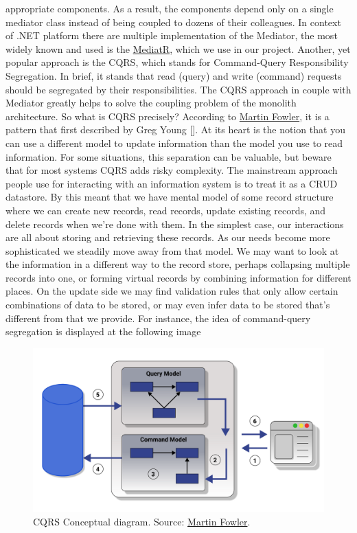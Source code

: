 appropriate components.
As a result, the components depend only on a single mediator class instead of being coupled to dozens of their colleagues.
In context of .NET platform there are multiple implementation of the Mediator, the most widely known and used is the
\href{https://github.com/jbogard/MediatR}{MediatR}, which we use in our project.
Another, yet popular approach is the CQRS, which stands for Command-Query Responsibility Segregation.
In brief, it stands that read (query) and write (command) requests should be segregated by their responsibilities.
The CQRS approach in couple with Mediator greatly helps to solve the coupling problem of the monolith architecture.
So what is CQRS precisely?
According to \href{https://martinfowler.com/bliki/CQRS.html}{Martin Fowler},
it is a pattern that first described by Greg Young [\cite{young2010cqrs}].
At its heart is the notion that you can use a different model to update information than the model you use to read information.
For some situations, this separation can be valuable, but beware that for most systems CQRS adds risky complexity.
The mainstream approach people use for interacting with an information system is to treat it as a CRUD datastore.
By this meant that we have mental model of some record structure where we can create new records, read records,
update existing records, and delete records when we're done with them.
In the simplest case, our interactions are all about storing and retrieving these records.
As our needs become more sophisticated we steadily move away from that model.
We may want to look at the information in a different way to the record store, perhaps collapsing multiple records into one,
or forming virtual records by combining information for different places.
On the update side we may find validation rules that only allow certain combinations of data to be stored, or may even infer
data to be stored that's different from that we provide.
For instance, the idea of command-query segregation is displayed at the following image

\begin{figure}[H]
    \centering
    \includegraphics[width=1\textwidth]{Pictures/cqrs.pdf}
    \caption{CQRS Conceptual diagram.
    Source: \href{https://martinfowler.com/bliki/CQRS.html}{Martin Fowler}.}
    \label{fig:figure}
\end{figure}

